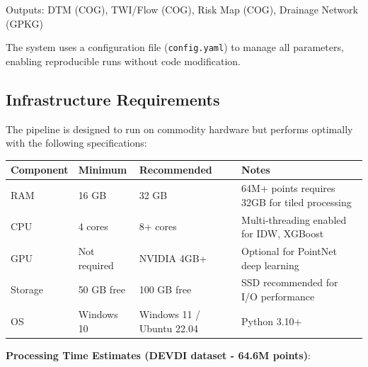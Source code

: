 \documentclass[a4paper,12pt]{article}
\begin{document}
Outputs: DTM (COG), TWI/Flow (COG), Risk Map (COG), Drainage Network (GPKG)

\bigskip

The system uses a configuration file (\texttt{config.yaml}) to manage all parameters, enabling reproducible runs without code modification.

\subsection{Infrastructure Requirements}

The pipeline is designed to run on commodity hardware but performs optimally with the following specifications:

\begin{table}[H]
	\centering
	\begin{tabularx}{\linewidth}{|L|L|L|L|}
		\toprule
		\textbf{Component} & \textbf{Minimum} & \textbf{Recommended}      & \textbf{Notes}                                 \\
		\midrule
		RAM                & 16 GB            & 32 GB                     & 64M+ points requires 32GB for tiled processing \\
		CPU                & 4 cores          & 8+ cores                  & Multi-threading enabled for IDW, XGBoost       \\
		GPU                & Not required     & NVIDIA 4GB+               & Optional for PointNet deep learning            \\
		Storage            & 50 GB free       & 100 GB free               & SSD recommended for I/O performance            \\
		OS                 & Windows 10       & Windows 11 / Ubuntu 22.04 & Python 3.10+                                   \\
		\bottomrule
	\end{tabularx}
\end{table}

\bigskip

\textbf{Processing Time Estimates (DEVDI dataset - 64.6M points)}:
\end{document}
